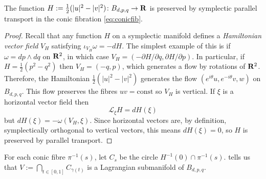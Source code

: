 \documentclass{article}
\begin{document}
\begin{Lemma}\label{lma:sptconic}
The function \(H:=\frac{1}{2}(|u|^2-|v|^2)\colon B_{d,p,q}\to\mathbf{R}\)
is preserved by symplectic parallel transport in the conic fibration
\cref{eq:conicfib}.
\end{Lemma}
\begin{proof}
Recall that any function \(H\) on a symplectic manifold defines a
{\em Hamiltonian vector field} \(V_H\) satisfying
\(\iota_{V_H}\omega=-dH\). The simplest example of this is if
\(\omega=dp\wedge dq\) on \(\mathbf{R}^2\), in which case \(V_H=(-\partial
H/\partial q,\partial H/\partial p)\). In particular, if
\(H=\frac{1}{2}(p^2-q^2)\) then \(V_H=(-q,p)\), which generates a
flow by rotations of \(\mathbf{R}^2\). Therefore, the Hamiltonian
\(\frac{1}{2}(|u|^2-|v|^2)\) generates the flow
\((e^{i\theta}u,e^{-i\theta}v,w)\) on \(B_{d,p,q}\). This flow
preserves the fibres \(uv=\mbox{const}\) so \(V_H\) is vertical. If
\(\xi\) is a horizontal vector field then
\[\mathcal{L}_{\xi}H=dH(\xi)\] but
\(dH(\xi)=-\omega(V_H,\xi)\). Since horizontal vectors are, by
definition, symplectically orthogonal to vertical vectors, this
means \(dH(\xi)=0\), so \(H\) is preserved by parallel
transport. \qedhere


\end{proof}
\begin{comment}
\begin{Lemma}
Consider the function \(G(u,v,w)=Im(w^p)\). The subset \(G=H=0\) is
a Lagrangian cell complex in \(B_{d,p,q}\), i.e. a 2-dimensional
cell complex whose 2-cells are smooth discs on which \(\omega\)
vanishes.
\end{Lemma}
\begin{proof}
Since \(dG(V_G)=-\omega(V_G,V_G)=0\), we see that \(V_G\) is tangent
to \(G=0\). Similarly \(V_H\) is tangent to \(H=0\). Since \(V_H\)
is tangent to the fibres \(w^p=\mbox{const}\) we have \(dG(V_H)=0\),
so \(V_H\) is also tangent to \(G=0\). Since
\(dG(V_H)=-\omega(V_G,V_H)=\omega(V_H,V_G)=-dH(V_G)\), we see that
\(V_G\) is also tangent to \(H=0\), so where these vectors are
linearly independent they span the tangent space to
\(G=H=0\). Moreover, \(\omega(V_G,V_H)=0\), which shows that these
tangent spaces are Lagrangian. \qedhere
\end{proof}
\end{comment}


For each conic fibre \(\pi^{-1}(s)\), let \(C_s\) be the circle
\(H^{-1}(0)\cap \pi^{-1}(s)\).  tells us that
\(V:=\bigcap_{t\in[0,1]}C_{\gamma(t)}\) is a Lagrangian submanifold of
\(B_{d,p,q}\).
\end{document}
